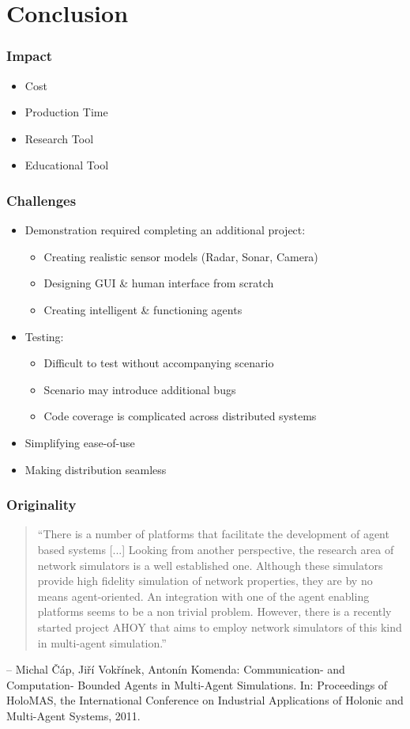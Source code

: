 \documentclass[mathserif,usenames,dvipsnames]{beamer}
\begin{document}
\section{Conclusion}
\frame
{
    \frametitle{Impact}
    \begin{itemize}
        \item Cost
        \item Production Time
        \item Research Tool
        \item Educational Tool
    \end{itemize}
}


\frame
{
    \frametitle{Challenges}
    \begin{itemize}
        \item Demonstration required completing an additional project:
        \begin{itemize}
            \item Creating realistic sensor models (Radar, Sonar, Camera)
            \item Designing GUI \& human interface from scratch
            \item Creating intelligent \& functioning agents
        \end{itemize}
        \item Testing:
        \begin{itemize}
            \item Difficult to test without accompanying scenario
            \item Scenario may introduce additional bugs
            \item Code coverage is complicated across distributed systems
        \end{itemize}
        \item Simplifying ease-of-use
        \item Making distribution seamless 
    \end{itemize}
}

\frame
{
    \frametitle{Originality}
    \begin{quote}
        \small 
        ``There is a number of platforms that facilitate the development of agent based systems [...] Looking from another perspective, the research area of network simulators is a well established one. Although these simulators provide high fidelity simulation of network properties, they are by no means agent-oriented. An integration with one of the agent enabling platforms seems to be a non trivial problem. However, there is a recently started project AHOY that aims to employ network simulators of this kind in multi-agent simulation.''
    \end{quote}
    \vspace{0.5cm}
    \tiny
    -- Michal \v{C}\'{a}p, Ji\v{r}\'{i} Vok\v{r}\'{i}nek, Anton\'{i}n Komenda: Communication- and Computation- Bounded Agents in Multi-Agent Simulations. In: Proceedings of HoloMAS, the International Conference on Industrial Applications of Holonic and Multi-Agent Systems, 2011.

}
\end{document}
